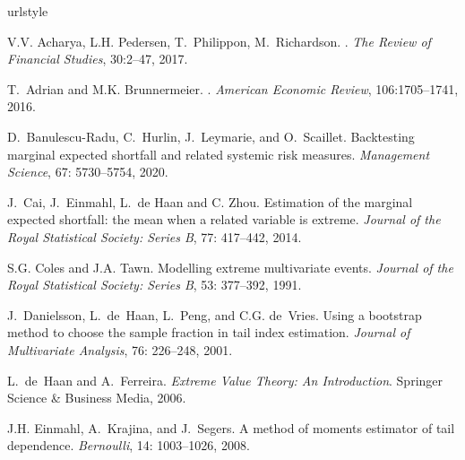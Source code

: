 \documentclass[11pt,letterpaper]{article}
\numberwithin{equation}{section}
\begin{document}
\begin{thebibliography}{29}
\providecommand{\natexlab}[1]{#1}
\providecommand{\url}[1]{\texttt{#1}}
\expandafter\ifx\csname urlstyle\endcsname\relax
  \providecommand{\doi}[1]{doi: #1}\else
  \providecommand{\doi}{doi: \begingroup \urlstyle{rm}\Url}\fi

V.V. Acharya, L.H. Pedersen, T.~Philippon, M.~Richardson.
.
\newblock \emph{The Review of Financial Studies}, 30:2--47, 2017.


T.~Adrian and M.K. Brunnermeier.
.
\newblock \emph{American Economic Review}, 106:1705--1741, 2016.


D.~Banulescu-Radu, C.~Hurlin, J.~Leymarie, and O.~Scaillet.
\newblock Backtesting marginal expected shortfall and related systemic risk
  measures.
\newblock \emph{Management Science}, 67: 5730--5754, 2020.


J.~Cai, J.~Einmahl, L.~de Haan and C. Zhou.
\newblock Estimation of the marginal expected shortfall: the mean when a related variable is extreme.
\newblock \emph{Journal of the Royal Statistical Society: Series B},
  77: 417--442, 2014.


S.G. Coles and J.A. Tawn.
\newblock Modelling extreme multivariate events.
\newblock \emph{Journal of the Royal Statistical Society: Series B},
  53: 377--392, 1991.

J.~Danielsson, L.~de~Haan, L.~Peng, and C.G. de~Vries.
\newblock Using a bootstrap method to choose the sample fraction in tail index
  estimation.
\newblock \emph{Journal of Multivariate Analysis}, 76: 226--248, 2001.

L.~de~Haan and A.~Ferreira.
\newblock \emph{Extreme Value Theory: An Introduction}.
\newblock Springer Science \& Business Media, 2006.

J.H. Einmahl, A.~Krajina, and J.~Segers.
\newblock A method of moments estimator of tail dependence.
\newblock \emph{Bernoulli}, 14: 1003--1026, 2008.


\end{thebibliography}
\end{document}
